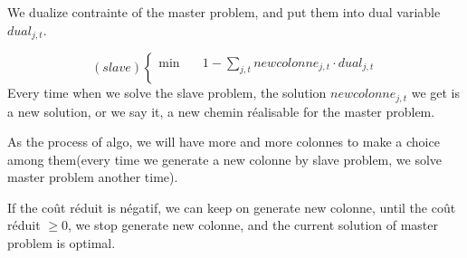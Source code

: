 \documentclass[a4paper]{article}
\begin{document}
We dualize contrainte of the master problem, and put them into dual variable $dual_{j,t}$.  

\begin{equation*}
    (slave) \left\{ 
    \begin{aligned}
    \min\quad  & 1-\sum_{j,t} newcolonne_{j,t}\cdot dual_{j,t}\\
  \end{aligned}
\right.
\end{equation*}
Every time when we solve the slave problem, the solution $newcolonne_{j,t}$ we get is a new solution, or we say it, a new chemin réalisable for the master problem.

As the process of algo, we will have more and more colonnes to make a choice among them(every time we generate a new colonne by slave problem, we solve master problem another time).

If the coût réduit is négatif, we can keep on generate new colonne, until the coût réduit $\geq$0, we stop generate new colonne, and the current solution of master problem is optimal.
\end{document}

